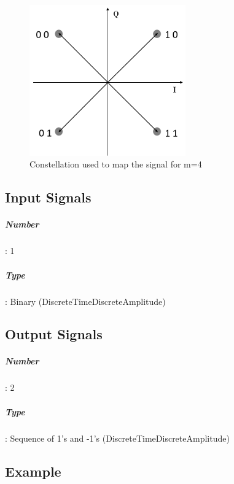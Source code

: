 \begin{figure}
	\centering
	\includegraphics[width=0.6\textwidth]{../m_qam_transmitter/figures/MQAM_constellation}
	
	\caption{Constellation used to map the signal for m=4 }\label{constellation}
	
\end{figure}  

\subsection*{Input Signals}

\subparagraph*{Number}: 1

\subparagraph*{Type}: Binary (DiscreteTimeDiscreteAmplitude)

\subsection*{Output Signals}

\subparagraph*{Number}: 2

\subparagraph*{Type}: Sequence of 1's and -1's (DiscreteTimeDiscreteAmplitude)

\subsection*{Example}

